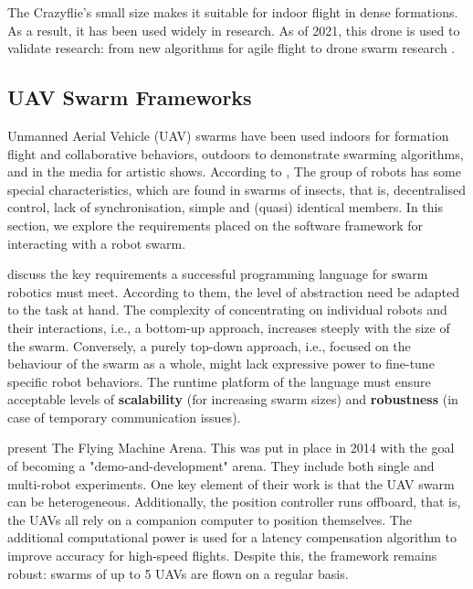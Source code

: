 The Crazyflie’s small size makes it suitable for indoor flight in dense formations. As a result, it has been used widely in research. As of 2021, this drone is used to validate research: from new algorithms for agile flight \cite{laclau_tempez_ruffier_natalizio_mouret_2020} to drone swarm research \cite{phan_hönig_ayanian_2018}.





 
\subsection{UAV Swarm Frameworks}

Unmanned Aerial Vehicle (UAV) swarms have been used indoors for formation flight and collaborative behaviors, outdoors to demonstrate swarming algorithms, and in the media for artistic shows. According to \textit{} \cite{swarm_review}, The group of robots has some special characteristics, which are found in swarms of insects, that is, decentralised control, lack of synchronisation, simple and (quasi) identical members. In this section, we explore the requirements placed on the software framework for interacting with a robot swarm. 


\cite{pinciroli_lee-brown_beltrame_2015} \hspace*{0.3cm} \textit{}
\hspace*{0.5cm} discuss the key requirements a successful programming language for swarm robotics must meet. According to them, the level of abstraction need be adapted to the task at hand. The complexity of concentrating on individual robots and their interactions, i.e., a bottom-up approach, increases steeply with the size of the swarm. Conversely, a purely top-down approach, i.e., focused on the behaviour of the swarm as a whole, might lack expressive power to fine-tune specific robot behaviors. The runtime platform of the language must ensure acceptable levels of \textbf{scalability} (for increasing swarm sizes) and \textbf{robustness} (in case of temporary communication issues). 

\cite{fma_paper} \textit{}
\hspace*{1cm} present The Flying Machine Arena. This was put in place in 2014 with the goal of becoming a "demo-and-development" arena. They include both single and multi-robot experiments. One key element of their work is that the UAV swarm can be heterogeneous. Additionally, the position controller runs offboard, that is, the UAVs all rely on a companion computer to position themselves. The additional computational power is used for a latency compensation algorithm to improve accuracy for high-speed flights. Despite this, the framework remains robust: swarms of up to 5 UAVs are flown on a regular basis.

